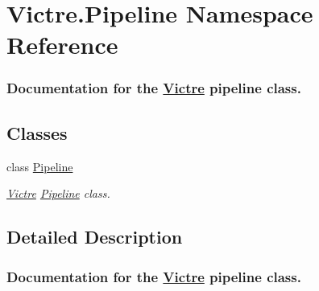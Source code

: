 \hypertarget{namespaceVictre_1_1Pipeline}{\section{Victre.\-Pipeline Namespace Reference}
\label{namespaceVictre_1_1Pipeline}
}


\subsubsection*{Documentation for the \hyperlink{namespaceVictre}{Victre} pipeline class.} 


\subsection*{Classes}
\begin{DoxyCompactItemize}
\item 
class \hyperlink{classVictre_1_1Pipeline_1_1Pipeline}{Pipeline}
\begin{DoxyCompactList}\small\item\em \hyperlink{namespaceVictre}{Victre} \hyperlink{classVictre_1_1Pipeline_1_1Pipeline}{Pipeline} class. \end{DoxyCompactList}\end{DoxyCompactItemize}


\subsection{Detailed Description}
\subsubsection*{Documentation for the \hyperlink{namespaceVictre}{Victre} pipeline class.}